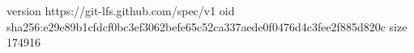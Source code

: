 version https://git-lfs.github.com/spec/v1
oid sha256:e29e89b1cfdcf0bc3ef3062befe65c52ca337aede0f0476d4c3fee2f885d820c
size 174916

